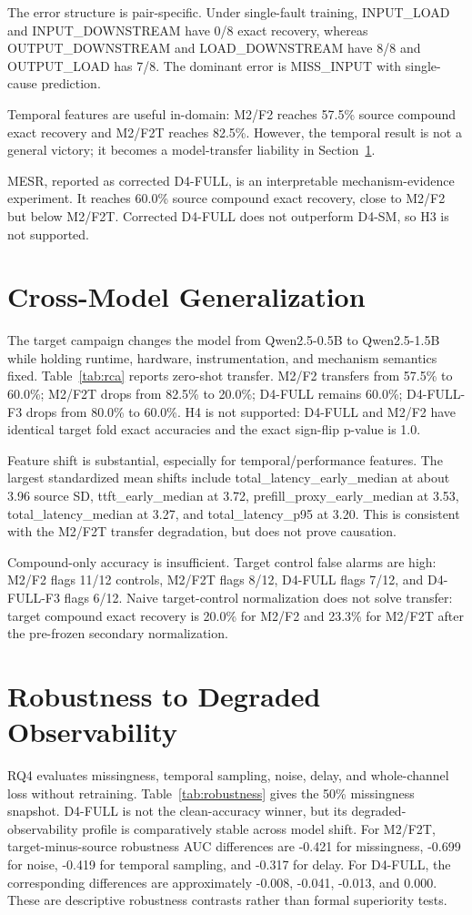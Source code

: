 \documentclass[11pt]{article}
\begin{document}
The error structure is pair-specific. Under single-fault training, INPUT\_LOAD and INPUT\_DOWNSTREAM have 0/8 exact recovery, whereas OUTPUT\_DOWNSTREAM and LOAD\_DOWNSTREAM have 8/8 and OUTPUT\_LOAD has 7/8. The dominant error is MISS\_INPUT with single-cause prediction.

Temporal features are useful in-domain: M2/F2 reaches 57.5\% source compound exact recovery and M2/F2T reaches 82.5\%. However, the temporal result is not a general victory; it becomes a model-transfer liability in Section~\ref{sec:generalization}.

MESR, reported as corrected D4-FULL, is an interpretable mechanism-evidence experiment. It reaches 60.0\% source compound exact recovery, close to M2/F2 but below M2/F2T. Corrected D4-FULL does not outperform D4-SM, so H3 is not supported.

\section{Cross-Model Generalization}
\label{sec:generalization}
The target campaign changes the model from Qwen2.5-0.5B to Qwen2.5-1.5B while holding runtime, hardware, instrumentation, and mechanism semantics fixed. Table~\ref{tab:rca} reports zero-shot transfer. M2/F2 transfers from 57.5\% to 60.0\%; M2/F2T drops from 82.5\% to 20.0\%; D4-FULL remains 60.0\%; D4-FULL-F3 drops from 80.0\% to 60.0\%. H4 is not supported: D4-FULL and M2/F2 have identical target fold exact accuracies and the exact sign-flip p-value is 1.0.



Feature shift is substantial, especially for temporal/performance features. The largest standardized mean shifts include total\_latency\_early\_median at about 3.96 source SD, ttft\_early\_median at 3.72, prefill\_proxy\_early\_median at 3.53, total\_latency\_median at 3.27, and total\_latency\_p95 at 3.20. This is consistent with the M2/F2T transfer degradation, but does not prove causation.

Compound-only accuracy is insufficient. Target control false alarms are high: M2/F2 flags 11/12 controls, M2/F2T flags 8/12, D4-FULL flags 7/12, and D4-FULL-F3 flags 6/12. Naive target-control normalization does not solve transfer: target compound exact recovery is 20.0\% for M2/F2 and 23.3\% for M2/F2T after the pre-frozen secondary normalization.

\section{Robustness to Degraded Observability}
RQ4 evaluates missingness, temporal sampling, noise, delay, and whole-channel loss without retraining. Table~\ref{tab:robustness} gives the 50\% missingness snapshot. D4-FULL is not the clean-accuracy winner, but its degraded-observability profile is comparatively stable across model shift. For M2/F2T, target-minus-source robustness AUC differences are -0.421 for missingness, -0.699 for noise, -0.419 for temporal sampling, and -0.317 for delay. For D4-FULL, the corresponding differences are approximately -0.008, -0.041, -0.013, and 0.000. These are descriptive robustness contrasts rather than formal superiority tests.
\end{document}
